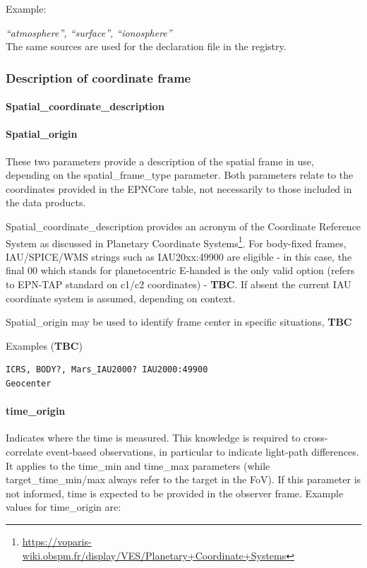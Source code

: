 \documentclass[11pt,a4paper]{ivoa}
\begin{document}
Example: 

\emph{``atmosphere'', ``surface'', ``ionosphere''}\\The same sources are used for the declaration file in the registry.

\subsubsection{Description of coordinate frame}

\paragraph{Spatial\_coordinate\_description}

\paragraph{Spatial\_origin}

These two parameters provide a description of the spatial frame in use, depending on the spatial\_frame\_type parameter. Both parameters relate to the coordinates provided in the EPNCore table, not necessarily to those included in the data products. 

Spatial\_coordinate\_description provides an acronym of the Coordinate Reference System as discussed in Planetary Coordinate Systems\footnote{\url{https://voparis-wiki.obspm.fr/display/VES/Planetary+Coordinate+Systems}}. For body-fixed frames, IAU/SPICE/WMS strings such as IAU20xx:49900 are eligible - in this case, the final 00 which stands for planetocentric E-handed is the only valid option (refers to EPN-TAP standard on c1/c2 coordinates) - \textbf{TBC}. If absent the current IAU coordinate system is assumed, depending on context. 

Spatial\_origin may be used to identify frame center in specific situations, \textbf{TBC}

Examples (\textbf{TBC})

\begin{verbatim}
ICRS, BODY?, Mars_IAU2000? IAU2000:49900
Geocenter
\end{verbatim}

\paragraph{time\_origin}

Indicates where the time is measured. This knowledge is required to cross-correlate event-based observations, in particular to indicate light-path differences. It applies to the time\_min and time\_max parameters (while target\_time\_min/max always refer to the target in the FoV). If this parameter is not informed, time is expected to be provided in the observer frame. Example values for time\_origin are:
\end{document}
